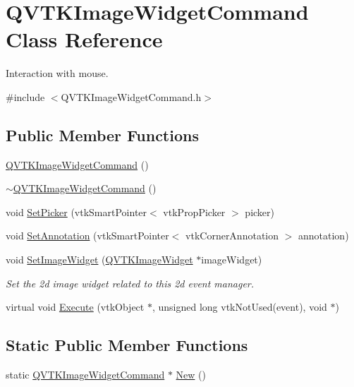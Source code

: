 \hypertarget{class_q_v_t_k_image_widget_command}{\section{Q\-V\-T\-K\-Image\-Widget\-Command Class Reference}
\label{d3/df0/class_q_v_t_k_image_widget_command}
}


Interaction with mouse.  




{\ttfamily \#include $<$Q\-V\-T\-K\-Image\-Widget\-Command.\-h$>$}

\subsection*{Public Member Functions}
\begin{DoxyCompactItemize}
\item 
\hyperlink{class_q_v_t_k_image_widget_command_a7664ac50450e1e52d6b22a49e142e91e}{Q\-V\-T\-K\-Image\-Widget\-Command} ()
\item 
\hyperlink{class_q_v_t_k_image_widget_command_a42df80e3ec4378584128db14e4e2feab}{$\sim$\-Q\-V\-T\-K\-Image\-Widget\-Command} ()
\item 
void \hyperlink{class_q_v_t_k_image_widget_command_a02c574c896c07d80401e0d925fd77816}{Set\-Picker} (vtk\-Smart\-Pointer$<$ vtk\-Prop\-Picker $>$ picker)
\item 
void \hyperlink{class_q_v_t_k_image_widget_command_a00fcd03c14718dd5b995629229403ebb}{Set\-Annotation} (vtk\-Smart\-Pointer$<$ vtk\-Corner\-Annotation $>$ annotation)
\item 
void \hyperlink{class_q_v_t_k_image_widget_command_a44e752014ef366b7dd8aaa766770a602}{Set\-Image\-Widget} (\hyperlink{class_q_v_t_k_image_widget}{Q\-V\-T\-K\-Image\-Widget} $\ast$image\-Widget)
\begin{DoxyCompactList}\small\item\em Set the 2d image widget related to this 2d event manager. \end{DoxyCompactList}\item 
virtual void \hyperlink{class_q_v_t_k_image_widget_command_ae45316925da93baefd64401aab274008}{Execute} (vtk\-Object $\ast$, unsigned long vtk\-Not\-Used(event), void $\ast$)
\end{DoxyCompactItemize}
\subsection*{Static Public Member Functions}
\begin{DoxyCompactItemize}
\item 
static \hyperlink{class_q_v_t_k_image_widget_command}{Q\-V\-T\-K\-Image\-Widget\-Command} $\ast$ \hyperlink{class_q_v_t_k_image_widget_command_a455f4d8f77c05f5657bf2850288308dd}{New} ()
\end{DoxyCompactItemize}
